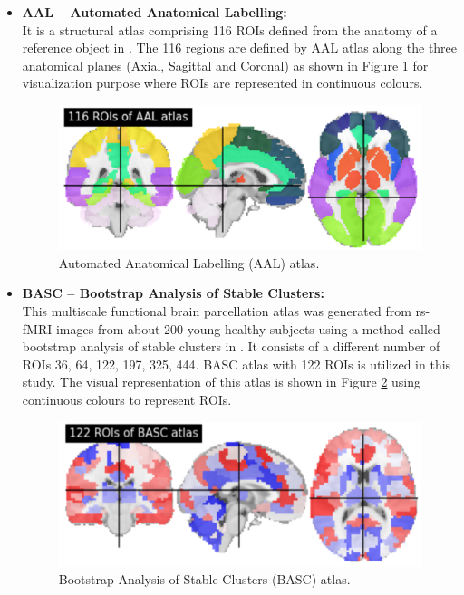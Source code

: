 \begin{itemize}
    \item \textbf{AAL – Automated Anatomical Labelling:} \\
    It is a structural atlas comprising 116 ROIs defined from the anatomy of a reference
object in \cite{tzourio2002automated}. The 116 regions are defined by AAL atlas along the three anatomical
planes (Axial, Sagittal and Coronal) as shown in Figure \ref{fig:3.3} for visualization purpose
where ROIs are represented in continuous colours.

\begin{figure}[h!]
\centering
\includegraphics[]{figures/Figure 3.3.png}
\caption{Automated Anatomical Labelling (AAL) atlas.}
\label{fig:3.3}
\end{figure}
\newpage
 \item \textbf{BASC – Bootstrap Analysis of Stable Clusters:} \\
This multiscale functional brain parcellation atlas was generated from rs-fMRI images
from about 200 young healthy subjects using a method called bootstrap analysis of
stable clusters in \cite{bellec2010multi}. It consists of a different number of ROIs {36, 64, 122, 197,
325, 444}. BASC atlas with 122 ROIs is utilized in this study. The visual
representation of this atlas is shown in Figure \ref{fig:3.4} using continuous colours to
represent ROIs.

\begin{figure}[h!]
\centering
\includegraphics[]{figures/Figure 3.4.png}
\caption{Bootstrap Analysis of Stable Clusters (BASC) atlas.}
\label{fig:3.4}
\end{figure}


\end{itemize}

